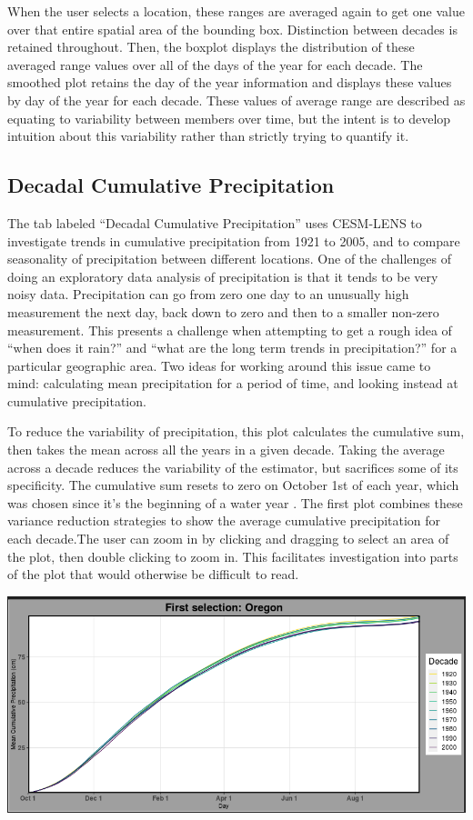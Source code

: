 \documentclass[10pt,letterpaper]{article}
\begin{document}
When the user selects a location, these ranges are averaged again to get one value over that entire spatial area of the bounding box. Distinction between decades is retained throughout. Then, the boxplot displays the distribution of these averaged range values over all of the days of the year for each decade. The smoothed plot retains the day of the year information and displays these values by day of the year for each decade. These values of average range are described as equating to variability between members over time, but the intent is to develop intuition about this variability rather than strictly trying to quantify it.




\subsection*{Decadal Cumulative Precipitation}

The tab labeled “Decadal Cumulative Precipitation” uses CESM-LENS to investigate trends in cumulative precipitation from 1921 to 2005, and to compare seasonality of precipitation between different locations. One of the challenges of doing an exploratory data analysis of precipitation is that it tends to be very noisy data. Precipitation can go from zero one day to an unusually high measurement the next day, back down to zero and then to a smaller non-zero measurement. This presents a challenge when attempting to get a rough idea of “when does it rain?” and “what are the long term trends in precipitation?” for a particular geographic area. Two ideas for working around this issue came to mind: calculating mean precipitation for a period of time, and looking instead at cumulative precipitation.

To reduce the variability of precipitation, this plot calculates the cumulative sum, then takes the mean across all the years in a given decade. Taking the average across a decade reduces the variability of the estimator, but sacrifices some of its specificity. The cumulative sum resets to zero on October 1st of each year, which was chosen since it’s the beginning of a water year \cite{usgs}. The first plot combines these variance reduction strategies to show the average cumulative precipitation for each decade.The user can zoom in by clicking and dragging to select an area of the plot, then double clicking to zoom in. This facilitates investigation into parts of the plot that would otherwise be difficult to read.

\begin{center}
  \includegraphics[width = .8\textwidth]{graphics/cumulative}
\end{center}
\end{document}
